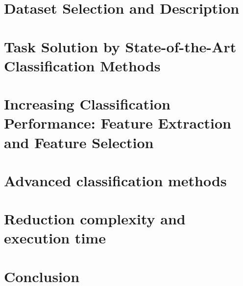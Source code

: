 \documentclass[conference,onecolumn]{IEEEtran}
\begin{document}
\section{Dataset Selection and Description}
\section{Task Solution by State-of-the-Art Classification Methods}



\section{Increasing Classification Performance: Feature Extraction and Feature Selection}	
\section{Advanced classification methods}
\section{Reduction complexity and execution time}
\section{Conclusion}
\end{document}
